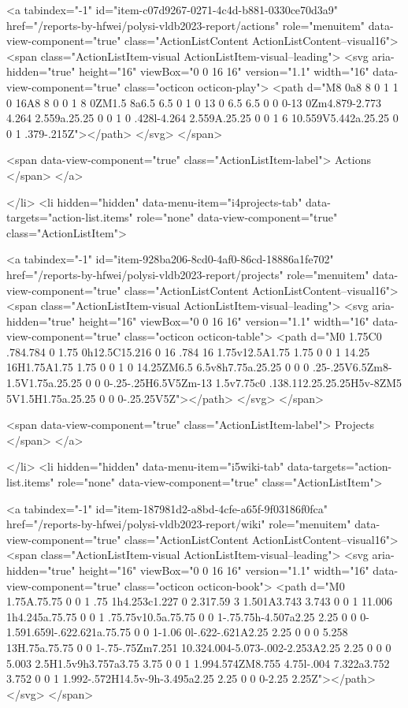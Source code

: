 {{    
    <a tabindex="-1" id="item-c07d9267-0271-4c4d-b881-0330ce70d3a9" href="/reports-by-hfwei/polysi-vldb2023-report/actions" role="menuitem" data-view-component="true" class="ActionListContent ActionListContent--visual16">
        <span class="ActionListItem-visual ActionListItem-visual--leading">
          <svg aria-hidden="true" height="16" viewBox="0 0 16 16" version="1.1" width="16" data-view-component="true" class="octicon octicon-play">
    <path d="M8 0a8 8 0 1 1 0 16A8 8 0 0 1 8 0ZM1.5 8a6.5 6.5 0 1 0 13 0 6.5 6.5 0 0 0-13 0Zm4.879-2.773 4.264 2.559a.25.25 0 0 1 0 .428l-4.264 2.559A.25.25 0 0 1 6 10.559V5.442a.25.25 0 0 1 .379-.215Z"></path>
</svg>
        </span>
      
        <span data-view-component="true" class="ActionListItem-label">
          Actions
</span>      
</a>
  
</li>
        <li hidden="hidden" data-menu-item="i4projects-tab" data-targets="action-list.items" role="none" data-view-component="true" class="ActionListItem">
    
    
    <a tabindex="-1" id="item-928ba206-8cd0-4af0-86cd-18886a1fe702" href="/reports-by-hfwei/polysi-vldb2023-report/projects" role="menuitem" data-view-component="true" class="ActionListContent ActionListContent--visual16">
        <span class="ActionListItem-visual ActionListItem-visual--leading">
          <svg aria-hidden="true" height="16" viewBox="0 0 16 16" version="1.1" width="16" data-view-component="true" class="octicon octicon-table">
    <path d="M0 1.75C0 .784.784 0 1.75 0h12.5C15.216 0 16 .784 16 1.75v12.5A1.75 1.75 0 0 1 14.25 16H1.75A1.75 1.75 0 0 1 0 14.25ZM6.5 6.5v8h7.75a.25.25 0 0 0 .25-.25V6.5Zm8-1.5V1.75a.25.25 0 0 0-.25-.25H6.5V5Zm-13 1.5v7.75c0 .138.112.25.25.25H5v-8ZM5 5V1.5H1.75a.25.25 0 0 0-.25.25V5Z"></path>
</svg>
        </span>
      
        <span data-view-component="true" class="ActionListItem-label">
          Projects
</span>      
</a>
  
</li>
        <li hidden="hidden" data-menu-item="i5wiki-tab" data-targets="action-list.items" role="none" data-view-component="true" class="ActionListItem">
    
    
    <a tabindex="-1" id="item-187981d2-a8bd-4cfe-a65f-9f03186f0fca" href="/reports-by-hfwei/polysi-vldb2023-report/wiki" role="menuitem" data-view-component="true" class="ActionListContent ActionListContent--visual16">
        <span class="ActionListItem-visual ActionListItem-visual--leading">
          <svg aria-hidden="true" height="16" viewBox="0 0 16 16" version="1.1" width="16" data-view-component="true" class="octicon octicon-book">
    <path d="M0 1.75A.75.75 0 0 1 .75 1h4.253c1.227 0 2.317.59 3 1.501A3.743 3.743 0 0 1 11.006 1h4.245a.75.75 0 0 1 .75.75v10.5a.75.75 0 0 1-.75.75h-4.507a2.25 2.25 0 0 0-1.591.659l-.622.621a.75.75 0 0 1-1.06 0l-.622-.621A2.25 2.25 0 0 0 5.258 13H.75a.75.75 0 0 1-.75-.75Zm7.251 10.324.004-5.073-.002-2.253A2.25 2.25 0 0 0 5.003 2.5H1.5v9h3.757a3.75 3.75 0 0 1 1.994.574ZM8.755 4.75l-.004 7.322a3.752 3.752 0 0 1 1.992-.572H14.5v-9h-3.495a2.25 2.25 0 0 0-2.25 2.25Z"></path>
</svg>
        </span>
      
}}
